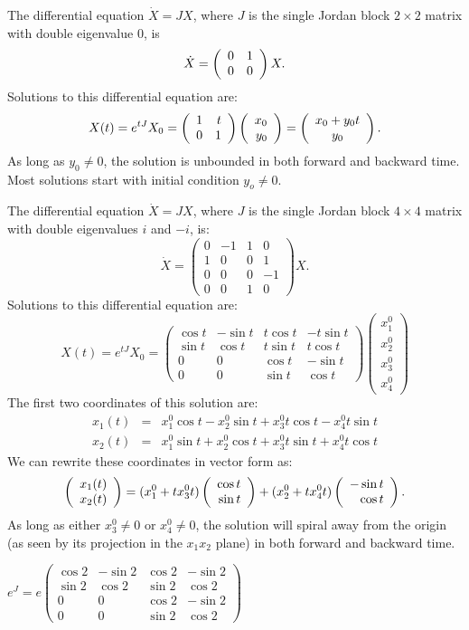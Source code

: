   The differential equation $\dot{X}=JX$, where $J$ is the 
single Jordan block $2\times 2$ matrix with double eigenvalue $0$, is
\[
\dot{X} = \left(\begin{array}{rr} 0 & 1\\ 0 &0\end{array}\right)X.
\]
Solutions to this differential equation are:
\[
X(t) = e^{tJ}X_0 = \left(\begin{array}{rr} 1 & t\\ 0 &1\end{array}\right)\left(\begin{array}{r} x_0 \\ y_0\end{array}\right) =
\left(\begin{array}{c} x_0+y_0t \\ y_0\end{array}\right).
\]
As long as $y_0\neq 0$, the solution is unbounded in both forward and 
backward time.  Most solutions start with initial condition $y_o\neq 0$.

  The differential equation $\dot{X}=JX$, where $J$ is the 
single Jordan block $4\times 4$ matrix with double eigenvalues $i$ and $-i$,
is:
\[
\dot{X} = \left(\begin{array}{rr|rr}
 0 & -1 & 1 &  0 \\
 1 &  0 & 0 &  1 \\
\hline
 0 &  0 & 0 & -1\\
 0 &  0 & 1 &  0
\end{array}\right)X.  
\]
Solutions to this differential equation are:
\[
X(t) = e^{tJ}X_0 = \left(\begin{array}{rrrr}
  \cos t & -\sin t & t\cos t & -t\sin t\\
  \sin t &  \cos t & t\sin t &  t\cos t\\
     0   &    0    &  \cos t &  -\sin t\\
     0   &    0    &  \sin t &   \cos t  
\end{array}\right)
\left(\begin{array}{r} x_1^0 \\  x_2^0 \\ x_3^0 \\ x_4^0 \end{array}\right)
\]
The first two coordinates of this solution are:
\begin{eqnarray*}
x_1(t) & = & x_1^0\cos t - x_2^0\sin t + x_3^0t\cos t - x_4^0t\sin t\\
x_2(t) & = & x_1^0\sin t + x_2^0\cos t + x_3^0t\sin t + x_4^0t\cos t
\end{eqnarray*}
We can rewrite these coordinates in vector form as:
\[
\left(\begin{array}{r} x_1(t) \\ x_2(t)\end{array}\right) =
(x_1^0 + tx_3^0t)\left(\begin{array}{r} \cos t \\ \sin t\end{array}\right) + 
(x_2^0 + tx_4^0t)\left(\begin{array}{r} -\sin t \\ \cos t\end{array}\right).
\] 
As long as either $x_3^0\neq 0$ or $x_4^0\neq 0$, the solution will spiral 
away from the origin (as seen by its projection in the $x_1x_2$ plane) in 
both forward and backward time.

  \ans $e^J = e\left(\begin{array}{rrrr}
  \cos 2 & -\sin 2 & \cos 2 & -\sin 2\\
  \sin 2 &  \cos 2 & \sin 2 &  \cos 2\\
     0   &    0    &  \cos 2 &  -\sin 2\\
     0   &    0    &  \sin 2 &   \cos 2  
\end{array}\right)$

